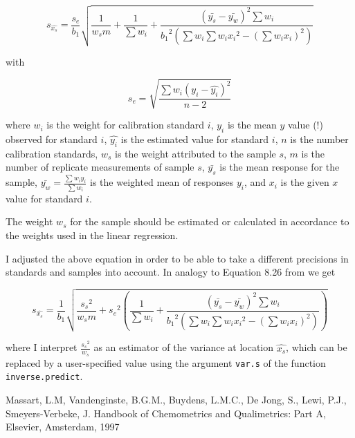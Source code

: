 \documentclass[a4paper]{article}
\begin{document}
\begin{equation}
s_{\hat{x_s}} = \frac{s_e}{b_1} \sqrt{\frac{1}{w_s m} + \frac{1}{\sum{w_i}} +
    \frac{(\bar{y_s} - \bar{y_w})^2 \sum{w_i}}
        {{b_1}^2 \left( \sum{w_i} \sum{w_i {x_i}^2} - 
            {\left( \sum{ w_i x_i } \right)}^2 \right) }}
\end{equation}

with

\begin{equation}
s_e = \sqrt{ \frac{\sum w_i (y_i - \hat{y_i})^2}{n - 2}}
\end{equation}

where $w_i$ is the weight for calibration standard $i$, $y_i$ is the mean $y$
value (!) observed for standard $i$, $\hat{y_i}$ is the estimated value for
standard $i$, $n$ is the number calibration standards, $w_s$ is the weight
attributed to the sample $s$, $m$ is the number of replicate measurements of
sample $s$, $\bar{y_s}$ is the mean response for the sample, 
$\bar{y_w} = \frac{\sum{w_i y_i}}{\sum{w_i}}$ is the weighted mean of responses
$y_i$, and $x_i$ is the given $x$ value for standard $i$.

The weight $w_s$ for the sample should be estimated or calculated in accordance
to the weights used in the linear regression. 

I adjusted the above equation in order to be able to take a different
precisions in standards and samples into account. In analogy to Equation 8.26
from \cite{massart97} we get

\begin{equation}
s_{\hat{x_s}} = \frac{1}{b_1} \sqrt{\frac{{s_s}^2}{w_s m} + 
    {s_e}^2 \left( \frac{1}{\sum{w_i}} +
        \frac{(\bar{y_s} - \bar{y_w})^2 \sum{w_i}}
            {{b_1}^2 \left( \sum{w_i} \sum{w_i {x_i}^2} - {\left( \sum{ w_i x_i } \right)}^2 \right) } \right) }
\end{equation}

where I interpret $\frac{{s_s}^2}{w_s}$ as an estimator of the variance at location
$\hat{x_s}$, which can be replaced by a user-specified value using the argument
\texttt{var.s} of the function \texttt{inverse.predict}.

\begin{thebibliography}{1}
Massart, L.M, Vandenginste, B.G.M., Buydens, L.M.C., De Jong, S., Lewi, P.J.,
Smeyers-Verbeke, J. 
\newblock Handbook of Chemometrics and Qualimetrics: Part A,
\newblock Elsevier, Amsterdam, 1997
\end{thebibliography}
\end{document}
